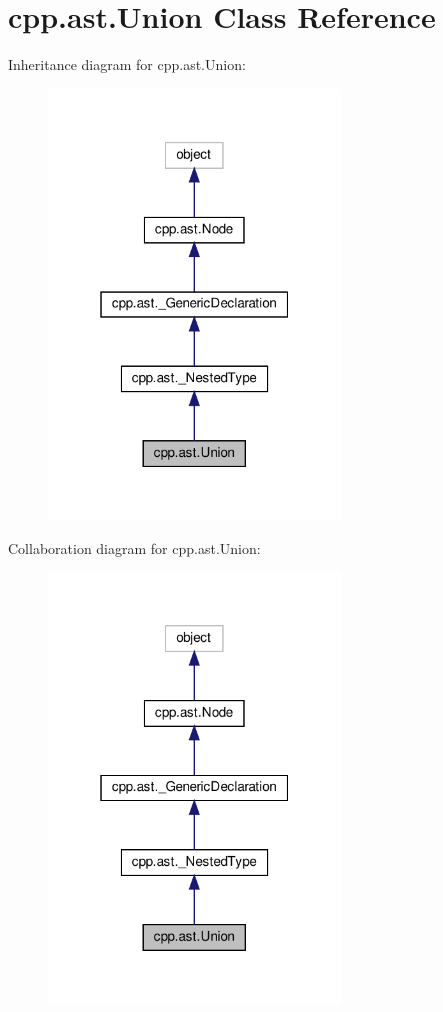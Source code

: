 \hypertarget{classcpp_1_1ast_1_1_union}{}\section{cpp.\+ast.\+Union Class Reference}
\label{classcpp_1_1ast_1_1_union}


Inheritance diagram for cpp.\+ast.\+Union\+:
\nopagebreak
\begin{figure}[H]
\begin{center}
\leavevmode
\includegraphics[width=220pt]{classcpp_1_1ast_1_1_union__inherit__graph}
\end{center}
\end{figure}


Collaboration diagram for cpp.\+ast.\+Union\+:
\nopagebreak
\begin{figure}[H]
\begin{center}
\leavevmode
\includegraphics[width=220pt]{classcpp_1_1ast_1_1_union__coll__graph}
\end{center}
\end{figure}
